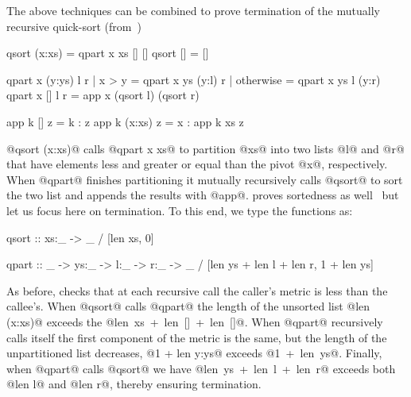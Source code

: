 The above techniques can be combined to prove 
termination of the mutually recursive quick-sort (from~\citep{XiTerminationLICS01})%
%
\begin{code}
  qsort (x:xs)   = qpart x xs [] []
  qsort []       = []

  qpart x (y:ys) l r 
    | x > y      = qpart x ys (y:l) r 
    | otherwise  = qpart x ys l (y:r)
  qpart x [] l r = app x (qsort l) (qsort r) 

  app k []     z = k : z
  app k (x:xs) z = x : app k xs z
\end{code}
%
@qsort (x:xs)@ calls @qpart x xs@ to partition @xs@ 
into two lists @l@ and @r@ that have elements less 
and greater or equal than the pivot @x@, respectively.
%
When @qpart@ finishes partitioning it mutually recursively
calls @qsort@ to sort the two list and appends the results 
with @app@. 
%
\toolname proves sortedness as well~\cite{vazou13} but let us 
focus here on termination. To this end, we type the functions
as:
%
\begin{code}
  qsort :: xs:_ -> _ 
        / [len xs, 0]
    
  qpart :: _ -> ys:_ -> l:_ -> r:_ -> _ 
        / [len ys + len l + len r, 1 + len ys]
\end{code}
%
As before, \toolname checks that at each recursive call 
the caller's metric is less than the callee's. 
%
When @qsort@ calls @qpart@ the length of the unsorted 
list @len (x:xs)@ exceeds the \hbox{@len xs + len [] + len []@}.
%
When @qpart@ recursively calls itself the first component
of the metric is the same, but the length of the unpartitioned 
list decreases, \ie @1 + len y:ys@ exceeds \hbox{@1 + len ys@}.
%
Finally, when @qpart@ calls @qsort@ we have \hbox{@len ys + len l + len r@}
exceeds both @len l@ and @len r@, thereby ensuring termination.



